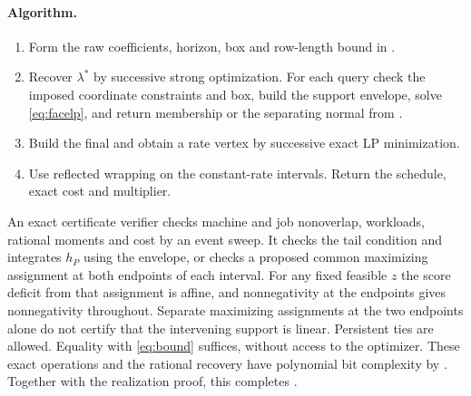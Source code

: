 \paragraph{Algorithm.}
\begin{enumerate}
\item Form the raw coefficients, horizon, box and row-length bound in .
\item Recover $\lambda^*$ by successive strong optimization. For each query check the imposed coordinate constraints and box, build the support envelope, solve \eqref{eq:facelp}, and return membership or the separating normal from .
\item Build the final \FaceLP{} and obtain a rate vertex by successive exact LP minimization.
\item Use reflected wrapping on the constant-rate intervals. Return the schedule, exact cost and multiplier.
\end{enumerate}

An exact certificate verifier checks machine and job nonoverlap, workloads, rational moments and cost by an event sweep. It checks the tail condition and integrates $h_P$ using the envelope, or checks a proposed common maximizing assignment at both endpoints of each interval. For any fixed feasible $z$ the score deficit from that assignment is affine, and nonnegativity at the endpoints gives nonnegativity throughout. Separate maximizing assignments at the two endpoints alone do not certify that the intervening support is linear. Persistent ties are allowed. Equality with \eqref{eq:bound} suffices, without access to the optimizer. These exact operations and the rational recovery have polynomial bit complexity by . Together with the realization proof, this completes .
